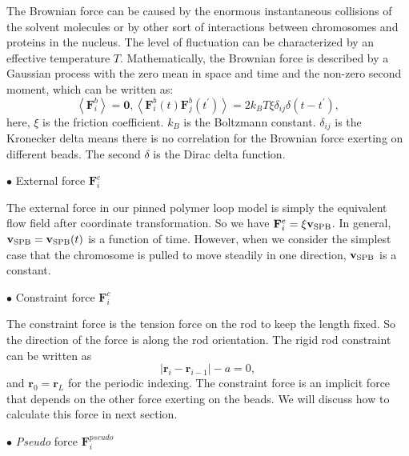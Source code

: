 The Brownian force can be caused by the enormous instantaneous collisions of the solvent molecules or by other sort of interactions between chromosomes and proteins in the nucleus. The level of fluctuation can be characterized by an effective temperature $T$. Mathematically, the Brownian force is described by a Gaussian process with the zero mean in space and time and the non-zero second moment, which can be written as:
\begin{subequations}
    \label{eq:brownianforce}
    \begin{equation}
        \left<\mathbf{F}_i^b\right> =\mathbf{0},
    \end{equation}
    \begin{equation}
        \left<\mathbf{F}_i^b(t)\mathbf{F}_j^b(t^{\prime})\right> = 2k_B T \xi \delta_{ij} \delta(t-t^{\prime}),
    \end{equation}
\end{subequations}
here, $\xi$ is the friction coefficient. $k_B$ is the Boltzmann constant. $\delta_{ij}$ is the Kronecker delta means there is no correlation for the Brownian force exerting on different beads. The second $\delta$ is the Dirac delta function. 

$\bullet$ External force $\mathbf{F}_i^{e}$

The external force in our pinned polymer loop model is simply the equivalent flow field after coordinate transformation. So we have $\mathbf{F}_i^e = \xi \mathbf{v}_{\rm{SPB}}$. In general, $\mathbf{v}_{\rm{SPB}} = \mathbf{v}_{\rm{SPB}}(t)$ is a function of time. However, when we consider the simplest case that the chromosome is pulled to move steadily in one direction, $\mathbf{v}_{\rm{SPB}}$ is a constant.

$\bullet$ Constraint force $\mathbf{F}_i^{c}$

The constraint force is the tension force on the rod to keep the length fixed. So the direction of the force is along the rod orientation. The rigid rod constraint can be written as 
\begin{equation}
    \label{eq:rodConstraint}
    |\mathbf{r}_{i} - \mathbf{r}_{i-1}| - a = 0,
\end{equation}
and $\mathbf{r}_{0} = \mathbf{r}_L$ for the periodic indexing. The constraint force is an implicit force that depends on the other force exerting on the beads. We will discuss how to calculate this force in next section. 

$\bullet$ \emph{Pseudo} force $\mathbf{F}_i^{pseudo}$

